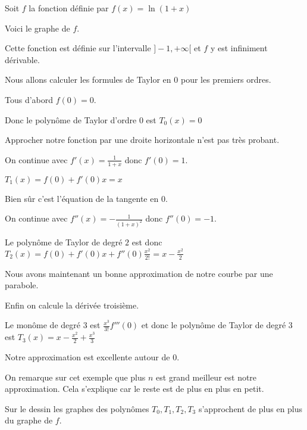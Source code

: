 Soit $f$ la fonction définie par $f(x)= \ln(1+x)$

\change 


Voici le graphe de $f$.

\change


Cette fonction est définie sur l'intervalle $]-1,+\infty[$ et  $f$ y est infiniment dérivable.

Nous allons calculer les formules de Taylor en $0$ pour les premiers ordres.

\change

Tous d'abord $f(0)=0$. 

\change

Donc le polynôme de Taylor d'ordre $0$ est $T_0(x)=0$

\change

Approcher notre fonction par une droite horizontale n'est pas très probant.

\change

On continue avec $f'(x)=\frac{1}{1+x}$ donc $f'(0)=1$.

\change

$T_1(x) = f(0) + f'(0)x = x$

\change

Bien sûr c'est l'équation de la tangente en $0$.

\change

On continue avec $f''(x) = -\frac{1}{(1+x)^2}$ donc $f''(0)=-1$.

\change

Le polynôme de Taylor de degré $2$ est donc $T_2(x) = f(0) + f'(0)x+f''(0)\frac{x^2}{2!} =x -\frac{x^2}{2}$

\change

Nous avons maintenant un bonne approximation de notre courbe par une parabole.

\change

Enfin on calcule la dérivée troisième.

\change

Le monôme de degré $3$ est $\frac{x^3}{3!}f'''(0)$
et donc le polynôme de Taylor de degré $3$ est $T_3(x) = x -\frac{x^2}{2} + \frac{x^3}{3}$

\change

Notre approximation est excellente autour de $0$.

\change

On remarque sur cet exemple que
plus $n$ est grand meilleur est notre approximation.
Cela s'explique car le reste est de plus en plus en petit.

Sur le dessin les graphes des polynômes $T_0, T_1, T_2, T_3$ s'approchent de plus en plus du graphe de $f$.

